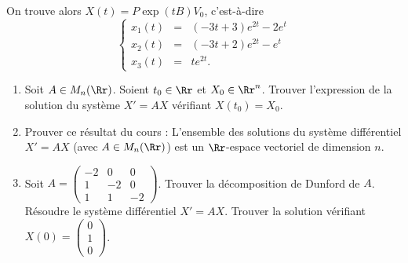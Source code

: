 \documentclass[12pt, class=report,crop=false]{standalone}
\begin{document}
\begin{exemple}
\begin{enumerate}
On trouve alors $X(t) = P\exp(tB)V_0$, c'est-à-dire
\[
\left\{
\begin{array}{rcl}
x_1(t) &=& (-3t+3)e^{2t}-2e^t\\
x_2(t) &=& (-3t+2)e^{2t}-e^t\\
x_3(t) &=& te^{2t}.
\end{array}
\right.
\]

\end{enumerate}
\end{exemple}


 
\begin{miniexercices}
\sauteligne
\begin{enumerate}

  \item Soit $A \in M_n(\Rr)$. Soient $t_0 \in \Rr$ et $X_0 \in \Rr^n$. Trouver l'expression de la solution du système $X'=AX$ vérifiant $X(t_0)=X_0$.
  \item Prouver ce résultat du cours : \og{}L'ensemble des solutions du système différentiel $X' = A X$ (avec $A \in M_n(\Rr)$) est un $\Rr$-espace vectoriel de dimension $n$.\fg{}
  
  \item Soit $A = \left(\begin{smallmatrix}-2&0&0\\1&-2&0\\1&1&-2\end{smallmatrix}\right)$.
  Trouver la décomposition de Dunford de $A$. Résoudre le système différentiel $X'=AX$.
  Trouver la solution vérifiant $X(0) = \left(\begin{smallmatrix}0\\1\\0\end{smallmatrix}\right)$.
  

\end{enumerate}
\end{miniexercices}
\end{document}
